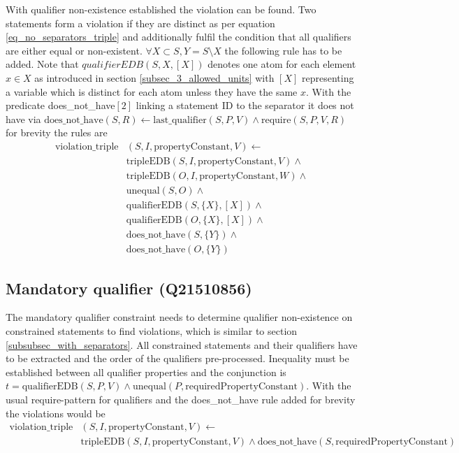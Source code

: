 \documentclass[hyperref,bachelorofscience,fleqn]{cgvpub}
\begin{document}
With qualifier non-existence established the violation can be found. Two statements form a violation if they are distinct as per equation \ref{eq_no_separators_triple} and additionally fulfil the condition that all qualifiers are either equal or non-existent. \(\forall X \subset S, Y = S \setminus X\) the following rule has to be added. Note that \(qualifierEDB(S, {X}, [X])\) denotes one atom for each element \(x \in X\) as introduced in section \ref{subsec_3_allowed_units} with \([X]\) representing a variable which is distinct for each atom unless they have the same \(x\). With the predicate does\_not\_have\([2]\) linking a statement ID to the separator it does not have via \(\text{does\_not\_have}(S, R) \leftarrow \text{last\_qualifier}(S, P, V) \wedge \text{require}(S, P, V, R)\) for brevity the rules are
\begin{equation*}
\begin{split}
\text{violation\_triple}&(S, I, \text{propertyConstant}, V) \leftarrow \\
&\text{tripleEDB}(S, I, \text{propertyConstant}, V) \wedge \\
&\text{tripleEDB}(O, I, \text{propertyConstant}, W) \wedge \\
&\text{unequal}(S, O) \wedge \\
&\text{qualifierEDB}(S, \{X\}, [X]) \wedge \\
&\text{qualifierEDB}(O, \{X\}, [X]) \wedge \\
&\text{does\_not\_have}(S, \{Y\}) \wedge \\
&\text{does\_not\_have}(O, \{Y\})
\end{split}
\end{equation*}

\subsection{Mandatory qualifier (Q21510856)}
The mandatory qualifier constraint needs to determine qualifier non-existence on constrained statements to find violations, which is similar to section \ref{subsubsec_with_separators}. All constrained statements and their qualifiers have to be extracted and the order of the qualifiers pre-processed. Inequality must be established between all qualifier properties and the conjunction is \(t = \text{qualifierEDB}(S, P, V) \wedge \text{unequal}(P, \text{requiredPropertyConstant})\). With the usual require-pattern for qualifiers and the does\_not\_have rule added for brevity the violations would be
\begin{equation*}
\begin{split}
\text{violation\_triple}&(S, I, \text{propertyConstant}, V) \leftarrow \\
&\text{tripleEDB}(S, I, \text{propertyConstant}, V) \wedge \text{does\_not\_have}(S, \text{requiredPropertyConstant})
\end{split}
\end{equation*}
\end{document}
